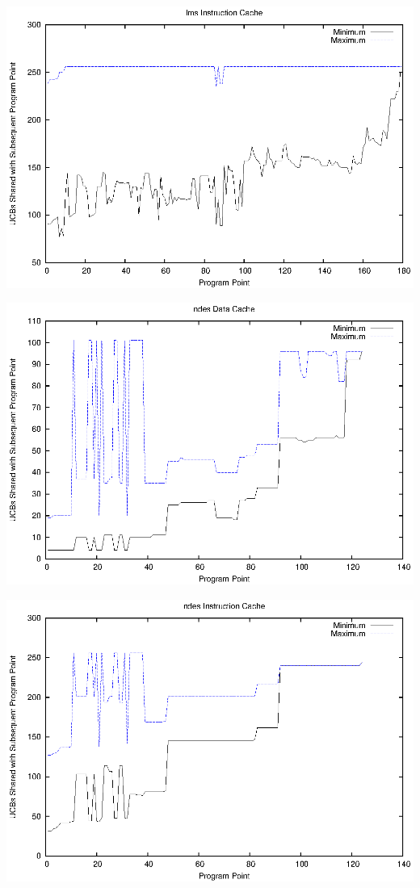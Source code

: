 \begin{center}
  \includegraphics[width=\linewidth]{eps/lms-icache.eps}
\end{center}

\begin{center}
  \includegraphics[width=\linewidth]{eps/ndes-dcache.eps}
\end{center}

\begin{center}
  \includegraphics[width=\linewidth]{eps/ndes-icache.eps}
\end{center}

